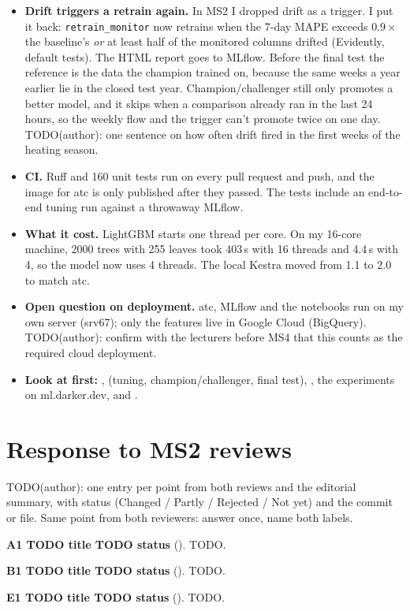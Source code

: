 \documentclass[10pt,a4paper]{article}
\newcommand{\point}[4]{\textbf{#1 \textperiodcentered{} #2 \textperiodcentered{} #3}\if\relax\detokenize{#4}\relax\else{} (\texttt{#4})\fi.}
\begin{document}
\begin{itemize}
        exists, passed the gate and holds exactly the committed settings. If MLflow is down or a check fails, the
        execution fails with one error line and the year stays closed. TODO(author): test-year MAPE against the 6.5\%
        target and the baseline's 7.6\%.
  \item \textbf{Drift triggers a retrain again.} In MS2 I dropped drift as a trigger. I put it back:
        \texttt{retrain\_monitor} now retrains when the 7-day MAPE exceeds $0.9\times$ the baseline's \emph{or} at least
        half of the monitored columns drifted (Evidently, default tests). The HTML report goes to MLflow. Before the
        final test the reference is the data the champion trained on, because the same weeks a year earlier lie in the
        closed test year. Champion/challenger still only promotes a better model, and it skips when a comparison already
        ran in the last 24 hours, so the weekly flow and the trigger can't promote twice on one day.
        TODO(author): one sentence on how often drift fired in the first weeks of the heating season.
  \item \textbf{CI.} Ruff and 160 unit tests run on every pull request and push, and the image for atc is only
        published after they passed. The tests include an end-to-end tuning run against a throwaway MLflow.
  \item \textbf{What it cost.} LightGBM starts one thread per core. On my 16-core machine, 2000 trees with 255 leaves
        took 403\,s with 16 threads and 4.4\,s with 4, so the model now uses 4 threads. The local Kestra moved from 1.1 to
        2.0 to match atc.
  \item \textbf{Open question on deployment.} atc, MLflow and the notebooks run on my own server (srv67); only the
        features live in Google Cloud (BigQuery). TODO(author): confirm with the lecturers before MS4 that this counts as
        the required cloud deployment.
  \item \textbf{Look at first:} ,  (tuning,
        champion/challenger, final test), , the experiments on ml.darker.dev,
        and .
\end{itemize}

\section{Response to MS2 reviews}
TODO(author): one entry per point from both reviews and the editorial summary, with status (Changed / Partly /
Rejected / Not yet) and the commit or file. Same point from both reviewers: answer once, name both labels.

\point{A1}{TODO title}{TODO status}{}
TODO.

\point{B1}{TODO title}{TODO status}{}
TODO.

\point{E1}{TODO title}{TODO status}{}
TODO.
\end{document}
